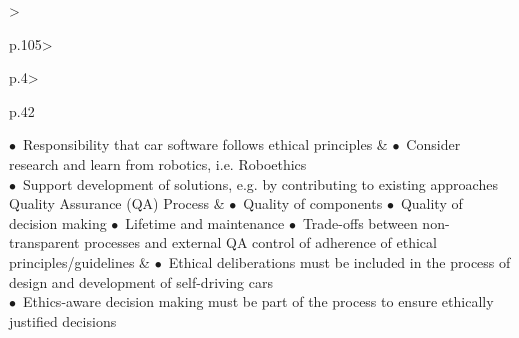 \begin{table}[t]
\begin{small}
\begin{supertabular}{%
		>{\raggedright}p{.105\textwidth}>{\raggedright}p{.4\textwidth}>{\raggedright}p{.42\textwidth}}
				\noindent $\bullet$~Responsibility that car software follows ethical principles
			& 
				\noindent $\bullet$~Consider research and learn from robotics, i.e. Roboethics \cite{Dodig-Crnkovic:2008:SMR:1566864.1566888}\\
				\noindent $\bullet$~Support development of solutions, e.g. by contributing to existing approaches \cite{DepartmentforTransportDfT2017}
 			 \tabularnewline \hline %
			Quality Assurance (QA) Process & 
				 \noindent $\bullet$~Quality of components
				 \noindent $\bullet$~Quality of decision making
				 \noindent $\bullet$~Lifetime and maintenance
				\noindent $\bullet$~Trade-offs between non-transparent processes and external QA control of adherence of ethical principles/guidelines
			& 
				\noindent $\bullet$~Ethical deliberations must be included in the process of design and development of self-driving cars\\
				\noindent $\bullet$~Ethics-aware decision making must be part of the process to ensure ethically justified decisions
 			 \tabularnewline 					
			\bottomrule
		\end{supertabular}
	\end{small}
	
\end{table}

